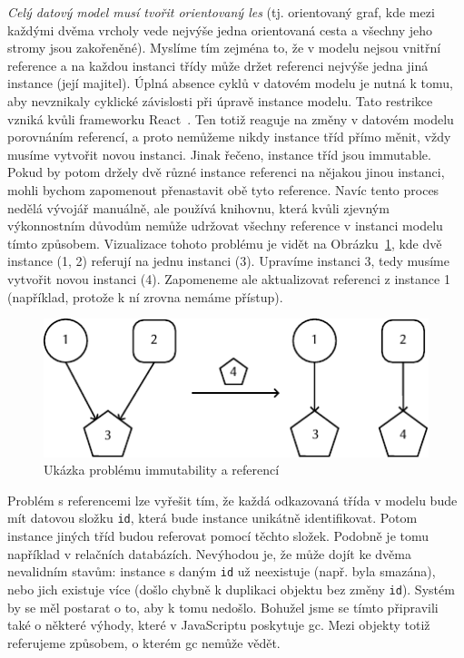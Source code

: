 \emph{Celý datový model musí tvořit orientovaný les} (tj. orientovaný graf, kde mezi každými dvěma vrcholy vede nejvýše jedna orientovaná cesta a všechny jeho stromy jsou zakořeněné).
Myslíme tím zejména to, že v modelu nejsou vnitřní reference a na každou instanci třídy může držet referenci nejvýše jedna jiná instance (její majitel).
Úplná absence cyklů v datovém modelu je nutná k tomu, aby nevznikaly cyklické závislosti při úpravě instance modelu.
Tato restrikce vzniká kvůli frameworku React~\cite{react_2023}.
Ten totiž reaguje na změny v datovém modelu porovnáním referencí, a proto nemůžeme nikdy instance tříd přímo měnit, vždy musíme vytvořit novou instanci.
Jinak řečeno, instance tříd jsou immutable.
Pokud by potom držely dvě různé instance referenci na nějakou jinou instanci, mohli bychom zapomenout přenastavit obě tyto reference.
Navíc tento proces nedělá vývojář manuálně, ale používá knihovnu, která kvůli zjevným výkonnostním důvodům nemůže udržovat všechny reference v instanci modelu tímto způsobem.
Vizualizace tohoto problému je vidět na Obrázku~\ref{fig:immutability-references}, kde dvě instance (1, 2) referují na jednu instanci (3).
Upravíme instanci 3, tedy musíme vytvořit novou instanci (4).
Zapomeneme ale aktualizovat referenci z instance 1 (například, protože k ní zrovna nemáme přístup).

\begin{figure}[!htb]
  \centering
  \includegraphics[width=\maxwidth{\textwidth}]{../img/react-references.pdf}
  \caption{Ukázka problému immutability a referencí}
  \label{fig:immutability-references}
\end{figure}

Problém s referencemi lze vyřešit tím, že každá odkazovaná třída v modelu bude mít datovou složku \texttt{id}, která bude instance unikátně identifikovat.
Potom instance jiných tříd budou referovat pomocí těchto složek.
Podobně je tomu například v relačních databázích.
Nevýhodou je, že může dojít ke dvěma nevalidním stavům: instance s daným \texttt{id} už neexistuje (např. byla smazána), nebo jich existuje více (došlo chybně k duplikaci objektu bez změny \texttt{id}).
Systém by se měl postarat o to, aby k tomu nedošlo.
Bohužel jsme se tímto připravili také o některé výhody, které v JavaScriptu poskytuje \acrfull{gc}.
Mezi objekty totiž referujeme způsobem, o kterém \acrshort{gc} nemůže vědět.


